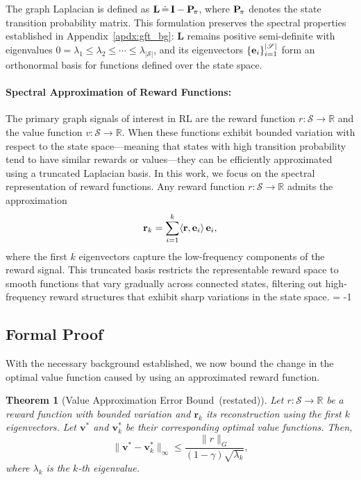 \documentclass{article}
\theoremstyle{plain}
\newtheorem{theorem}{Theorem}[section]
\theoremstyle{definition}
\theoremstyle{remark}
\newcommand{\ValueApproxName}{Value Approximation Error Bound}
\begin{document}
The graph Laplacian is defined as $\mathbf{L} \, \dot{=} \, \mathbf{I} - \mathbf{P}_{\!\pi}$, where $\mathbf{P}_{\!\pi}$ denotes the state transition probability matrix. This formulation preserves the spectral properties established in Appendix~\ref{apdx:gft_bg}: $\mathbf{L}$ remains positive semi-definite with eigenvalues $0 = \lambda_1 \leq \lambda_2 \leq \cdots \leq \lambda_{|\mathscr{S}|}$, and its eigenvectors $\{\mathbf{e}_i\}_{i=1}^{|\mathscr{S}|}$ form an orthonormal basis for functions defined over the state space.

\paragraph{Spectral Approximation of Reward Functions:} 
The primary graph signals of interest in RL are the reward function $r: \mathscr{S} \to \mathbb{R}$ and the value function $v: \mathscr{S} \to \mathbb{R}$. When these functions exhibit bounded variation with respect to the state space---meaning that states with high transition probability tend to have similar rewards or values---they can be efficiently approximated using a truncated Laplacian basis. In this work, we focus on the spectral representation of reward functions. Any reward function $r: \mathscr{S} \to \mathbb{R}$ admits the approximation
\begin{equation}
    \mathbf{r}_k = \sum_{i=1}^{k} \langle \mathbf{r}, \mathbf{e}_i \rangle \, \mathbf{e}_i,
\end{equation}
where the first $k$ eigenvectors capture the low-frequency components of the reward signal. This truncated basis restricts the representable reward space to smooth functions that vary gradually across connected states, filtering out high-frequency reward structures that exhibit sharp variations in the state space. \looseness = -1


\subsection{Formal Proof}
\label{sec:proof}

With the necessary background established, we now bound the change in the optimal value function caused by using an approximated reward function.

\begin{theorem}[\ValueApproxName \, (restated)]
Let $r: \mathscr{S} \to \mathbb{R}$ be a reward function with bounded variation and $\mathbf{r}_k$ its reconstruction using the first $k$ eigenvectors. Let $\mathbf{v}^*$ and $\mathbf{v}^*_k$ be their corresponding optimal value functions. Then,
\begin{equation}
    \|\mathbf{v}^* - \mathbf{v}^*_k\|_\infty \le \frac{\|r\|_G}{(1-\gamma)\sqrt{\lambda_k}},
\end{equation}
where $\lambda_k$ is the $k$-th eigenvalue.
\end{theorem}
\end{document}
